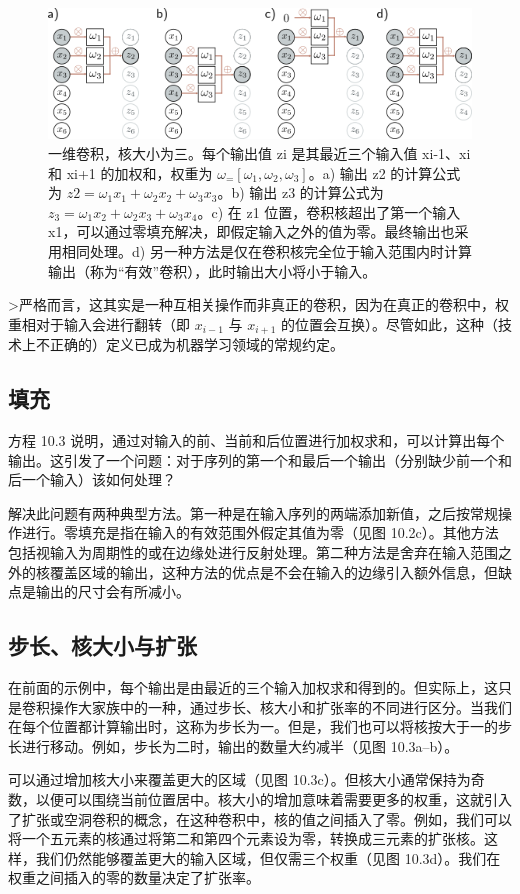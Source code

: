\begin{figure}[ht!]
\centering
\includegraphics[width=0.7\linewidth]{png/chapter10/Conv1.png}
\caption{一维卷积，核大小为三。每个输出值 zi 是其最近三个输入值 xi-1、xi 和 xi+1 的加权和，权重为 \(\omega_ = [\omega_1, \omega_2, \omega_3]\)。a) 输出 z2 的计算公式为 \(z2 = \omega_1x_1 + \omega_2x_2 + \omega_3x_3\)。b) 输出 z3 的计算公式为 \(z_3 = \omega_1x_2 + \omega_2x_3 + \omega_3x_4\)。c) 在 z1 位置，卷积核超出了第一个输入 x1，可以通过零填充解决，即假定输入之外的值为零。最终输出也采用相同处理。d) 另一种方法是仅在卷积核完全位于输入范围内时计算输出（称为“有效”卷积），此时输出大小将小于输入。}
\end{figure}


>严格而言，这其实是一种互相关操作而非真正的卷积，因为在真正的卷积中，权重相对于输入会进行翻转（即 \(x_{i-1}\) 与 \(x_{i+1}\) 的位置会互换）。尽管如此，这种（技术上不正确的）定义已成为机器学习领域的常规约定。
\subsection{填充}
方程 10.3 说明，通过对输入的前、当前和后位置进行加权求和，可以计算出每个输出。这引发了一个问题：对于序列的第一个和最后一个输出（分别缺少前一个和后一个输入）该如何处理？

解决此问题有两种典型方法。第一种是在输入序列的两端添加新值，之后按常规操作进行。零填充是指在输入的有效范围外假定其值为零（见图 10.2c）。其他方法包括视输入为周期性的或在边缘处进行反射处理。第二种方法是舍弃在输入范围之外的核覆盖区域的输出，这种方法的优点是不会在输入的边缘引入额外信息，但缺点是输出的尺寸会有所减小。

\subsection{步长、核大小与扩张}
在前面的示例中，每个输出是由最近的三个输入加权求和得到的。但实际上，这只是卷积操作大家族中的一种，通过步长、核大小和扩张率的不同进行区分。当我们在每个位置都计算输出时，这称为步长为一。但是，我们也可以将核按大于一的步长进行移动。例如，步长为二时，输出的数量大约减半（见图 10.3a–b）。

可以通过增加核大小来覆盖更大的区域（见图 10.3c）。但核大小通常保持为奇数，以便可以围绕当前位置居中。核大小的增加意味着需要更多的权重，这就引入了扩张或空洞卷积的概念，在这种卷积中，核的值之间插入了零。例如，我们可以将一个五元素的核通过将第二和第四个元素设为零，转换成三元素的扩张核。这样，我们仍然能够覆盖更大的输入区域，但仅需三个权重（见图 10.3d）。我们在权重之间插入的零的数量决定了扩张率。


